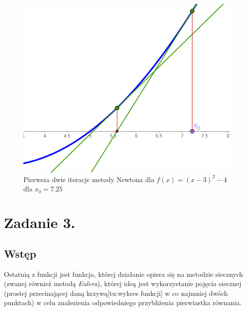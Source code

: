 \documentclass[a4paper,14pt]{report}
\begin{document}
  \begin{figure}[H]
    \includegraphics[scale=1.0]{zad1b}
    \centering
    \caption{Pierwsza dwie iteracje metody Newtona dla  $f(x)=(x-3)^{2}-4$ dla $x_{0} =7.25$ }
  \end{figure}
\chapter{Zadanie 3.}
  \section{Wstęp}
  Ostatnią z funkcji jest funkcja, której działanie opiera się na metodzie siecznych (zwanej również metodą \textit{Eulera}), której ideą jest wykorzystanie pojęcia siecznej (prostej przecinającej daną krzywą[tu:wykres funkcji] w co najmniej dwóch punktach) w celu znalezienia odpowiedniego przybliżenia pierwiastka równania.
\end{document}
